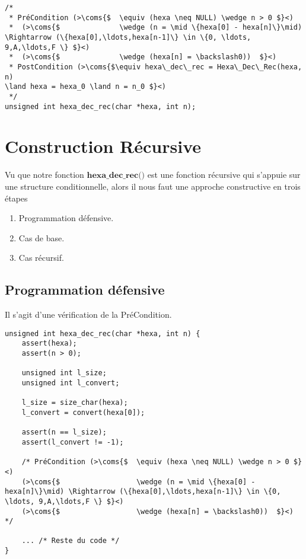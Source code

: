 \documentclass[a4paper, 11pt, oneside]{article}
\newcommand{\coms}[1]{\textcolor{MidnightBlue}{#1}}
\begin{document}
		\begin{lstlisting}[caption={Spécification}]
/*
 * PréCondition (>\coms{$  \equiv (hexa \neq NULL) \wedge n > 0 $}<)
 *  (>\coms{$              \wedge (n = \mid \{hexa[0] - hexa[n]\}\mid) \Rightarrow (\{hexa[0],\ldots,hexa[n-1]\} \in \{0, \ldots, 9,A,\ldots,F \} $}<) 
 *  (>\coms{$              \wedge (hexa[n] = \backslash0))  $}<)
 * PostCondition (>\coms{$\equiv hexa\_dec\_rec = Hexa\_Dec\_Rec(hexa, n)
\land hexa = hexa_0 \land n = n_0 $}<)
 */
unsigned int hexa_dec_rec(char *hexa, int n);
		\end{lstlisting}


\newpage
\section{Construction Récursive}\label{recur}

	Vu que notre fonction $\textbf{hexa\_dec\_rec()}$ est une fonction récursive qui s'appuie sur une structure conditionnelle, 
	alors il nous faut une approche constructive en trois étapes
	
	\begin{enumerate}
		\item Programmation défensive.
		\item Cas de base.
		\item Cas récursif.
	\end{enumerate} 
	
	\subsection{Programmation défensive}
	
		Il s'agit d'une vérification de la PréCondition.

		\begin{lstlisting}[caption={hexa\_dec\_rec()}]
unsigned int hexa_dec_rec(char *hexa, int n) {
	assert(hexa);
	assert(n > 0);

	unsigned int l_size;
	unsigned int l_convert;

	l_size = size_char(hexa);
	l_convert = convert(hexa[0]);

	assert(n == l_size);
	assert(l_convert != -1);

    /* PréCondition (>\coms{$  \equiv (hexa \neq NULL) \wedge n > 0 $}<)
    (>\coms{$                  \wedge (n = \mid \{hexa[0] - hexa[n]\}\mid) \Rightarrow (\{hexa[0],\ldots,hexa[n-1]\} \in \{0, \ldots, 9,A,\ldots,F \} $}<) 
    (>\coms{$ 				   \wedge (hexa[n] = \backslash0))  $}<) */ 
	
	... /* Reste du code */
}
		\end{lstlisting}
\end{document}
